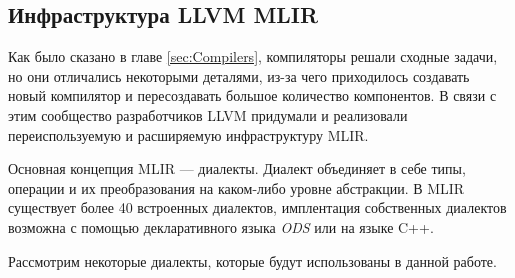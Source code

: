 \subsection{Инфраструктура LLVM MLIR}
\label{impl:mlir} %

Как было сказано в главе \ref{sec:Compilers}, компиляторы
решали сходные задачи, но они отличались некоторыми деталями, из-за чего
приходилось создавать новый компилятор и пересоздавать большое количество
компонентов. В связи с этим сообщество разработчиков LLVM придумали и реализовали
переиспользуемую и расширяемую инфраструктуру MLIR.

Основная концепция MLIR --- диалекты. Диалект объединяет в себе типы, операции
и их преобразования на каком-либо уровне абстракции. В MLIR существует более 40
встроенных диалектов, имплентация собственных диалектов возможна с помощью
декларативного языка \textit{ODS} или на языке C++.

Рассмотрим некоторые диалекты, которые будут использованы в данной работе.

